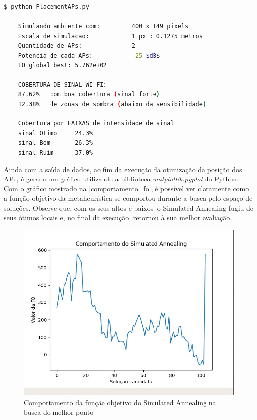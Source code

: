 \documentclass[
	12pt,				%
	twoside,			%
	a4paper,			%
	english,			%
	french,				%
	spanish,			%
	brazil				%
	]{abntex2}
\begin{document}
\begin{lstlisting}[language=bash]
    $ python PlacementAPs.py 

    Simulando ambiente com:         400 x 149 pixels
    Escala de simulacao:            1 px : 0.1275 metros
    Quantidade de APs:              2
    Potencia de cada APs:           -25 $dB$
    FO global best: 5.762e+02

    COBERTURA DE SINAL WI-FI:
    87.62%   com boa cobertura (sinal forte)
    12.38%   de zonas de sombra (abaixo da sensibilidade)

    Cobertura por FAIXAS de intensidade de sinal
    sinal Otimo     24.3%
    sinal Bom       26.3%
    sinal Ruim      37.0%

\end{lstlisting}

Ainda com a saída de dados, ao fim da execução da otimização da posição
dos APs, é gerado um gráfico utilizando a biblioteca
\emph{matplotlib.pyplot} do Python. Com o gráfico mostrado na
\autoref{comportamento_fo}, é possível ver claramente como a função
objetivo da metaheurística se comportou durante a busca pelo espaço de
soluções. Observe que, com os seus altos e baixos, o Simulated Annealing
fugiu de seus ótimos locais e, no final da execução, retornou à sua
melhor avaliação.

\begin{figure}[ht]
    \caption{\label{comportamento_fo} Comportamento da função objetivo do Simulated Annealing na busca do melhor ponto}
    \begin{center}
        \includegraphics[scale=0.5]{imagens/comportamento-fo.jpg}
    \end{center}
\end{figure}
\end{document}
